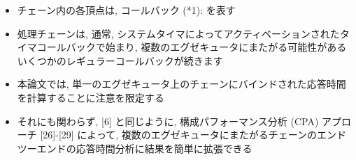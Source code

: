 \begin{frame}{}
    \begin{itemize}
        \item チェーン内の各頂点は, コールバック (*1): を表す
        \item 処理チェーンは, 通常, システムタイマによってアクティベーションされたタイマコールバックで始まり, 複数のエグゼキュータにまたがる可能性があるいくつかのレギュラーコールバックが続きます
        \item 本論文では, 単一のエグゼキュータ上のチェーンにバインドされた応答時間を計算することに注意を限定する
        \item それにも関わらず, [6] と同じように, 構成パフォーマンス分析 (CPA) アプローチ [26]-[29] によって, 複数のエグゼキュータにまたがるチェーンのエンドツーエンドの応答時間分析に結果を簡単に拡張できる
    \end{itemize}
\end{frame}
